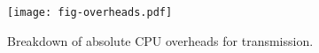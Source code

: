 \begin{figure}[H]
\texttt{[image: fig-overheads.pdf]}
\caption{Breakdown of absolute CPU overheads for transmission.}
\label{fig:overheads}
\end{figure}

